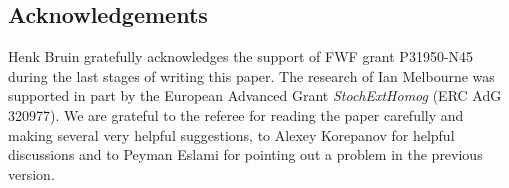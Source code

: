 \documentclass[AHL,Unicode,longabstracts,published]{cedram}
\begin{document}
\subsection*{Acknowledgements}
Henk Bruin gratefully acknowledges the support of FWF grant P31950-N45 during the last stages of writing this paper. The research of Ian Melbourne was supported in part by the European Advanced Grant \emph{StochExtHomog} (ERC AdG 320977). We are grateful to the referee for reading the paper carefully and making several very helpful suggestions, to Alexey Korepanov for helpful discussions and to Peyman Eslami for pointing out a problem in the previous version.




\end{document}
